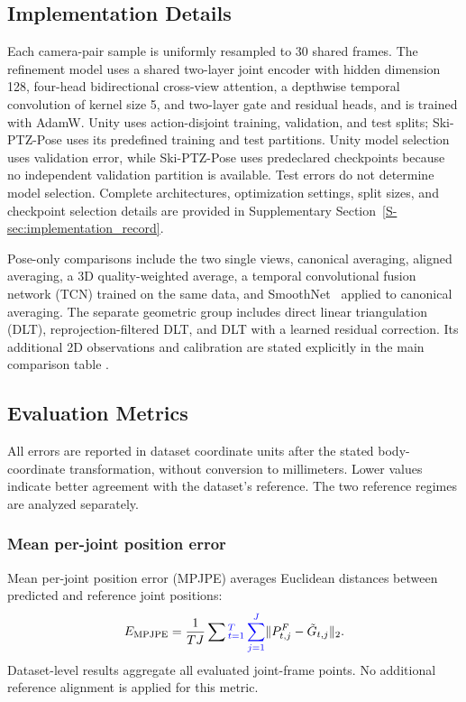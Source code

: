 \documentclass[preprint,12pt]{elsarticle}
\providecommand{\DIFaddbegin}{} %
\providecommand{\DIFaddend}{} %
\providecommand{\DIFadd}[1]{{\protect\color{blue}#1}} %
\begin{document}

\DIFaddend \subsection{Implementation Details}
\label{subsec:implementation_details}

Each camera-pair sample is uniformly resampled to 30 shared frames. The refinement model uses a shared  \DIFaddbegin \DIFadd{two-layer joint encoder with hidden dimension 128, four-head bidirectional cross-view }\DIFaddend attention, a depthwise temporal convolution  \DIFaddbegin \DIFadd{of kernel size 5, and two-layer }\DIFaddend gate and residual heads, and is trained with AdamW. Unity uses action-disjoint training, validation, and test splits; Ski-PTZ-Pose uses its predefined training and test partitions. Unity model selection uses validation error, while Ski-PTZ-Pose uses predeclared checkpoints because no independent validation partition is available. Test errors do not determine model selection. Complete architectures, optimization settings, split sizes, and checkpoint selection details are provided in Supplementary Section~\ref{S-sec:implementation_record}.

Pose-only comparisons include \DIFaddbegin \DIFadd{the two }\DIFaddend single views, canonical  \DIFaddbegin \DIFadd{averaging, }\DIFaddend aligned averaging, \DIFaddbegin \DIFadd{a 3D }\DIFaddend quality-weighted  \DIFaddbegin \DIFadd{average, a temporal convolutional fusion }\DIFaddend network (TCN) \DIFaddbegin \DIFadd{trained on the same data}\DIFaddend , and SmoothNet~\cite{zeng2022smoothnet} applied to canonical averaging. The separate geometric group includes direct linear triangulation (DLT), reprojection-filtered DLT, and DLT with a learned residual correction. Its additional 2D observations and calibration are stated explicitly in the main comparison table  .

\subsection{Evaluation Metrics}

All errors are reported in dataset coordinate units after the stated body-coordinate transformation, without conversion to millimeters. Lower values indicate better agreement with the dataset's reference. The two reference regimes are analyzed separately.

\subsubsection{Mean per-joint position error}
Mean per-joint position error (MPJPE) averages Euclidean distances between predicted and reference joint positions:
\[
E_{\mathrm{MPJPE}}=\frac{1}{TJ}\sum \DIFaddbegin \DIFadd{_{t=1}^{T}\sum_{j=1}^{J}}\DIFaddend \|P^F_{t,j}-\tilde{G}_{t,j}\|_2.
\]
Dataset-level results aggregate all evaluated joint-frame points. No additional reference alignment is applied for this metric.
\end{document}
